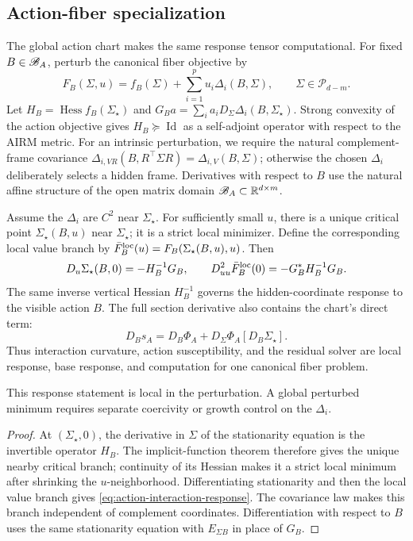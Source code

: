 \subsection{Action-fiber specialization}

The global action chart makes the same response tensor computational.  For
fixed \(B\in\mathscr B_A\), perturb the canonical fiber objective by
\begin{equation}
  F_B(\Sigma,u)
  =f_B(\Sigma)+\sum_{i=1}^p u_i\Delta_i(B,\Sigma),
  \qquad \Sigma\in\mathscr P_{d-m}.
  \label{eq:perturbed-action-fiber}
\end{equation}
Let \(H_B=\operatorname{Hess}f_B(\Sigma_\star)\) and
\(G_Ba=\sum_i a_iD_\Sigma\Delta_i(B,\Sigma_\star)\).  Strong convexity of
the action objective gives \(H_B\succeq\operatorname{Id}\) as a self-adjoint
operator with respect to the AIRM metric.  For an intrinsic perturbation,
we require the natural complement-frame covariance
\(\Delta_{i,VR}(B,R^\top\Sigma R)=\Delta_{i,V}(B,\Sigma)\); otherwise the
chosen \(\Delta_i\) deliberately selects a hidden frame.
Derivatives with respect to \(B\) use the natural affine structure of the open
matrix domain \(\mathscr B_A\subset\mathbb R^{d\times m}\).

\begin{corollary}
\label{cor:action-interaction-response}
Assume the \(\Delta_i\) are \(C^2\) near \(\Sigma_\star\).  For sufficiently
small \(u\), there is a unique critical point \(\Sigma_\star(B,u)\) near
\(\Sigma_\star\); it is a strict local minimizer.  Define the corresponding
local value branch by
\(\bar F_B^{\rm loc}(u)=F_B(\Sigma_\star(B,u),u)\).  Then
\begin{equation}
  D_u\Sigma_\star(B,0)=-H_B^{-1}G_B,
  \qquad
  D^2_{uu}\bar F_B^{\rm loc}(0)
  =-G_B^*H_B^{-1}G_B.
  \label{eq:action-interaction-response}
\end{equation}
The same inverse vertical Hessian \(H_B^{-1}\) governs the hidden-coordinate
response to the visible action \(B\).  The full section derivative also
contains the chart's direct term:
\[
  D_Bs_A=D_B\Phi_A+D_\Sigma\Phi_A[D_B\Sigma_\star].
\]
Thus interaction curvature, action susceptibility, and the residual solver
are local response, base response, and computation for one canonical fiber
problem.
\end{corollary}

This response statement is local in the perturbation.  A global perturbed
minimum requires separate coercivity or growth control on the \(\Delta_i\).

\begin{proof}
At \((\Sigma_\star,0)\), the derivative in \(\Sigma\) of the stationarity
equation is the invertible operator \(H_B\).  The implicit-function theorem
therefore gives the unique nearby critical branch; continuity of its Hessian
makes it a strict local minimum after shrinking the \(u\)-neighborhood.
Differentiating stationarity and then the local value branch gives
\cref{eq:action-interaction-response}.  The covariance law makes this branch
independent of complement coordinates.  Differentiation with respect to \(B\)
uses the same stationarity equation with \(E_{\Sigma B}\) in place of \(G_B\).
\end{proof}

